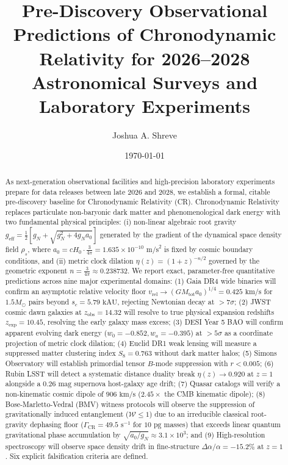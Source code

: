 \documentclass[aps,prd,reprint,superscriptaddress,nofootinbib,twocolumn,floatfix]{revtex4-2}
\begin{document}
\title{Pre-Discovery Observational Predictions of Chronodynamic Relativity for 2026--2028 Astronomical Surveys and Laboratory Experiments}

\author{Joshua A. Shreve}

\date{\today}

\begin{abstract}
As next-generation observational facilities and high-precision laboratory experiments prepare for data releases between late 2026 and 2028, we establish a formal, citable pre-discovery baseline for Chronodynamic Relativity (CR). Chronodynamic Relativity replaces particulate non-baryonic dark matter and phenomenological dark energy with two fundamental physical principles: (i) non-linear algebraic root gravity $g_{\text{eff}} = \frac{1}{2}\left[g_N + \sqrt{g_N^2 + 4 g_N a_0}\right]$ generated by the gradient of the dynamical space density field $\rho_s$, where $a_0 = c H_0 \cdot \frac{3}{4\pi} = 1.635 \times 10^{-10}\text{ m/s}^2$ is fixed by cosmic boundary conditions, and (ii) metric clock dilation $\eta(z) = (1+z)^{-n/2}$ governed by the geometric exponent $n = \frac{3}{4\pi} \approx 0.238732$. We report exact, parameter-free quantitative predictions across nine major experimental domains: (1) Gaia DR4 wide binaries will confirm an asymptotic relative velocity floor $v_{\text{rel}} \to (G M_{\text{tot}} a_0)^{1/4} = 0.425\text{ km/s}$ for $1.5 M_\odot$ pairs beyond $s_c = 5.79\text{ kAU}$, rejecting Newtonian decay at $>7\sigma$; (2) JWST cosmic dawn galaxies at $z_{\text{obs}} = 14.32$ will resolve to true physical expansion redshifts $z_{\text{exp}} = 10.45$, resolving the early galaxy mass excess; (3) DESI Year 5 BAO will confirm apparent evolving dark energy ($w_0 = -0.852, w_a = -0.395$) at $>5\sigma$ as a coordinate projection of metric clock dilation; (4) Euclid DR1 weak lensing will measure a suppressed matter clustering index $S_8 = 0.763$ without dark matter halos; (5) Simons Observatory will establish primordial tensor $B$-mode suppression with $r < 0.005$; (6) Rubin LSST will detect a systematic distance duality break $\eta(z) \to 0.920$ at $z=1$ alongside a $0.26\text{ mag}$ supernova host-galaxy age drift; (7) Quasar catalogs will verify a non-kinematic cosmic dipole of $906\text{ km/s}$ ($2.45\times$ the CMB kinematic dipole); (8) Bose-Marletto-Vedral (BMV) witness protocols will observe the suppression of gravitationally induced entanglement ($\mathcal{W} \le 1$) due to an irreducible classical root-gravity dephasing floor ($\Gamma_{\text{CR}} = 49.5\text{ s}^{-1}$ for $10\text{ pg}$ masses) that exceeds linear quantum gravitational phase accumulation by $\sqrt{a_0 / g_N} \approx 3.1 \times 10^3$; and (9) High-resolution spectroscopy will observe space density drift in fine-structure $\Delta\alpha/\alpha = -15.2\%$ at $z=1$. Six explicit falsification criteria are defined.
\end{abstract}
\end{document}
